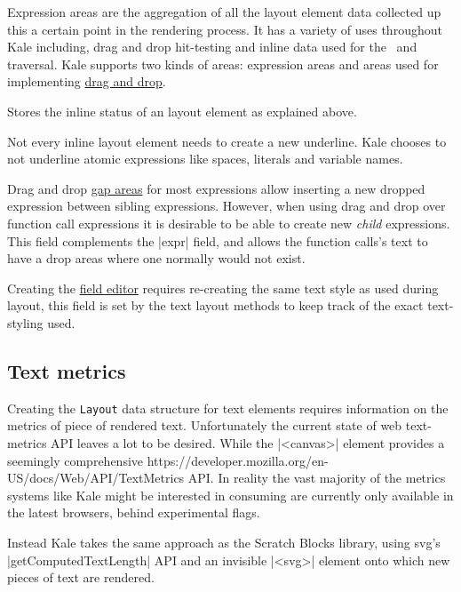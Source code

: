  Expression areas are the aggregation of all the layout element
data collected up this a certain point in the rendering process. It has a
variety of uses throughout Kale including, drag and drop hit-testing and inline
data used for the~\ak{^} and~ traversal. Kale supports two kinds of
areas: expression areas and  areas used for implementing
\hyperref[impl:dnd]{drag and drop}.

 Stores the inline status of an layout element as explained
above.

 Not every inline layout element needs to create
a new underline. Kale
chooses to not underline atomic expressions like spaces, literals and variable
names.


 Drag and drop \hyperref[layout:areas]{gap areas} for most
expressions allow inserting a new dropped expression between sibling
expressions. However, when using drag and drop over function call expressions
it is desirable to be able to create new \emph{child} expressions. This field
complements the |expr| field, and allows the function calls's text to have a
drop areas where one normally would not exist.

 Creating the \hyperref[soln:field_editing]{field editor} requires
re-creating the same text style as used during layout, this field is set by the
text layout methods to keep track of the exact text-styling used.

\subsection{Text metrics}

Creating the \texttt{Layout} data structure for text elements requires
information on the metrics of piece of rendered text. Unfortunately the current
state of web text-metrics API leaves a lot to be desired. While
the |<canvas>| element provides a seemingly comprehensive
{https://developer.mozilla.org/en-US/docs/Web/API/TextMetrics} API.
In reality the vast majority of the metrics systems like Kale might
be interested in consuming are currently only available in the latest
browsers, behind experimental flags.


Instead Kale takes the same approach as the Scratch Blocks \cite{ScratchBlocks}
library, using \ac{svg}'s |getComputedTextLength| API and an invisible
|<svg>| element onto which new pieces of text are rendered. 



